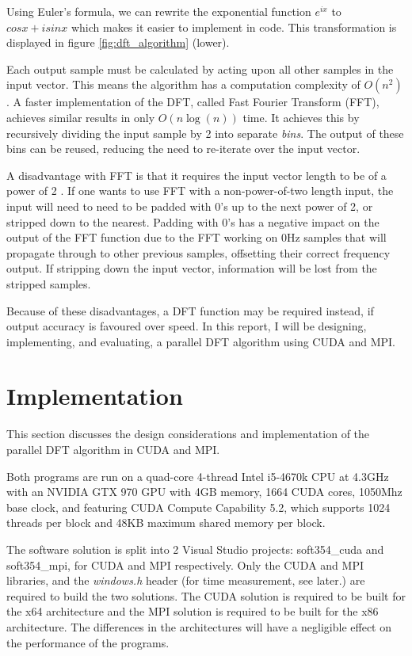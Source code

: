 \documentclass[11pt,a4paper]{article}
\begin{document}
Using Euler's formula, we can rewrite the exponential function $e^{ix}$ to $cos x + i sin x$ which makes it easier to implement in code. This transformation is displayed in figure \ref{fig:dft_algorithm} (lower).

Each output sample must be calculated by acting upon all other samples in the input vector. This means the algorithm has a computation complexity of $O(n^2)$. A faster implementation of the DFT, called Fast Fourier Transform (FFT), achieves similar results in only $O(n\log(n))$ time. It achieves this by recursively dividing the input sample by 2 into separate \textit{bins}. The output of these bins can be reused, reducing the need to re-iterate over the input vector.

A disadvantage with FFT is that it requires the input vector length to be of a power of 2 \citep{fft_adv_dis}. If one wants to use FFT with a non-power-of-two length input, the input will need to need to be padded with 0's up to the next power of 2, or stripped down to the nearest. Padding with 0's has a negative impact on the output of the FFT function due to the FFT  working on 0Hz samples that will propagate through to other previous samples, offsetting their correct frequency output. If stripping down the input vector, information will be lost from the stripped samples.

Because of these disadvantages, a DFT function may be required instead, if output accuracy is favoured over speed. In this report, I will be designing, implementing, and evaluating, a parallel DFT algorithm using CUDA and MPI.

\section{Implementation}
This section discusses the design considerations and implementation of the parallel DFT algorithm in CUDA and MPI.

Both programs are run on a quad-core 4-thread Intel i5-4670k CPU at 4.3GHz with an NVIDIA GTX 970 GPU with 4GB memory, 1664 CUDA cores, 1050Mhz base clock, and featuring CUDA Compute Capability 5.2, which supports 1024 threads per block and 48KB maximum shared memory per block.

The software solution is split into 2 Visual Studio projects: soft354\_cuda and soft354\_mpi, for CUDA and MPI respectively. Only the CUDA and MPI libraries, and the \textit{windows.h} header (for time measurement, see later.) are required to build the two solutions. 
The CUDA solution is required to be built for the x64 architecture and the MPI solution is required to be built for the x86 architecture. The differences in the architectures will have a negligible effect on the performance of the programs. 
\end{document}
